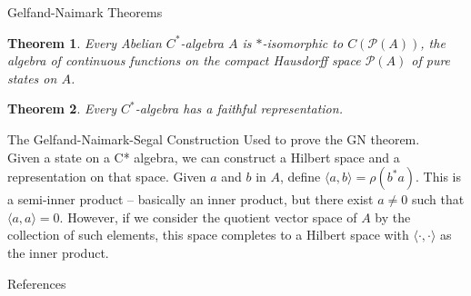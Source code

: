 \documentclass[11pt]{beamer}
\theoremstyle{definition}
\theoremstyle{plain}
\newtheorem{thm}{Theorem}
\renewcommand{\P}[1]{\mathscr{P}(#1)}
\begin{document}
\begin{frame} {Gelfand-Naimark Theorems}
	\begin{thm}
		Every Abelian $C^\ast$-algebra $A$ is $\ast$-isomorphic to $C(\P A)$, the 
		algebra of continuous functions on the compact Hausdorff space $\P A$ of pure 
		states on $A$.
	\end{thm}
	\pause
	\begin{thm}
		Every $C^\ast$-algebra has a faithful representation.
	\end{thm}
\end{frame}

\begin{frame} {The Gelfand-Naimark-Segal Construction}
	Used to prove the GN theorem. \\
	Given a state on a C* algebra, we can construct a Hilbert space and a representation on that space.
	Given $a$ and $b$ in $A$, define $\langle a, b \rangle = \rho(b^\ast a)$. This is a semi-inner product -- basically an inner product, but there exist $a \neq 0$ such that $\langle a,a \rangle = 0$.
	However, if we consider the quotient vector space of $A$ by the collection of such elements, this space completes to a Hilbert space with $\langle \cdot , \cdot \rangle$ as the inner product.
\end{frame}

\begin{frame} {References}
	
\end{frame}
\fi
\end{document}
